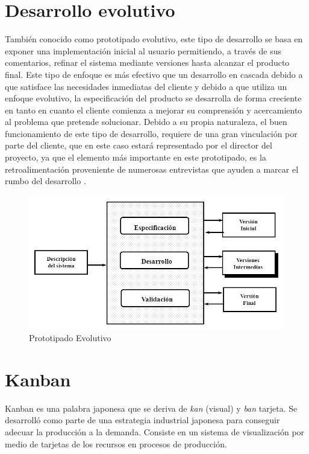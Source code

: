 \section{Desarrollo evolutivo}
\label{section:desarrollo}
También conocido como prototipado evolutivo, este tipo de desarrollo se basa en exponer una implementación inicial al usuario permitiendo, a través de sus comentarios, refinar el sistema mediante versiones hasta alcanzar el producto final.
Este tipo de enfoque es más efectivo que un desarrollo en cascada debido a que satisface las necesidades inmediatas del cliente y debido a que utiliza un enfoque evolutivo, la especificación del producto se desarrolla de forma creciente en tanto en cuanto el cliente comienza a mejorar su comprensión y acercamiento al problema que pretende solucionar.
Debido a su propia naturaleza, el buen funcionamiento de este tipo de desarrollo, requiere de una gran vinculación por parte del cliente, que en este caso estará representado por el director del proyecto, ya que el elemento más importante en este prototipado, es la retroalimentación proveniente de numerosas entrevistas que ayuden a marcar el rumbo del desarrollo \cite{Somm06}.

\begin{figure}[H]
\centering
\includegraphics[width=120mm, fbox={\fboxrule} 4mm]{images/04-metodo/01-protipado_evolutivo.jpg}
\caption{Prototipado Evolutivo}
\label{fig:prototipado_evolutivo}
\end{figure}

\section{Kanban}
Kanban es una palabra japonesa que se deriva de \textit{kan} (visual) y \textit{ban} tarjeta. Se desarrolló como parte de una estrategia industrial japonesa para conseguir adecuar la producción a la demanda. Consiste en un sistema de visualización por medio de tarjetas de los recursos en procesos de producción.

